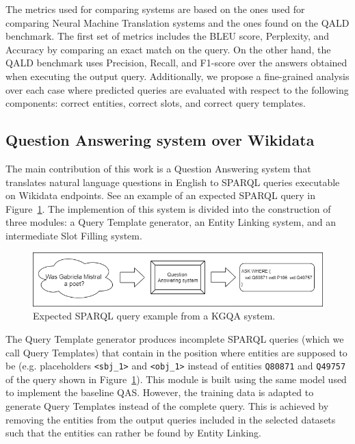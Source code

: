 The metrics used for comparing systems are based on the ones used for comparing Neural 
Machine Translation systems and the ones found on the QALD benchmark. The first set of 
metrics includes the BLEU score, Perplexity, and Accuracy by comparing an exact match on 
the \SPARQL{} query. On the other hand, the QALD benchmark uses Precision, Recall, and F1-score 
over the answers obtained when executing the output \SPARQL{} query. Additionally, 
we propose a fine-grained analysis over each case where predicted queries are evaluated with 
respect to the following components: correct entities, correct slots, and correct query 
templates.

\subsection*{Question Answering system over Wikidata}
\label{cap1:intro/contributions/qaWikidata}

The main contribution of this work is a Question Answering system that translates 
natural language questions in English to SPARQL queries executable on Wikidata endpoints. See an
example of an expected SPARQL query in Figure~\ref{fig:introQAexample}. The implemention of this 
system is divided into the construction of three modules: a Query Template generator, 
an Entity Linking system, and an intermediate Slot Filling system. 

\begin{figure}[!h]
    \centering
    \includegraphics[scale=.5]{imagenes/1_intro/introQuestionAnsweringExample.png}
    \caption{Expected SPARQL query example from a KGQA system.}
    \label{fig:introQAexample}
\end{figure}

The Query Template generator produces incomplete SPARQL queries (which we call 
Query Templates) that contain  in the position where entities are 
supposed to be (e.g. placeholders \texttt{<sbj\_1>} and \texttt{<obj\_1>} instead of entities 
\texttt{Q80871} and \texttt{Q49757} of the query shown in Figure~\ref{fig:introQAexample}). 
This module is built using the same model used to implement the baseline QAS. 
However, the training data is adapted to generate Query Templates instead of the complete 
query. This is achieved by removing the entities from the output \SPARQL{} queries included 
in the selected datasets such that the entities can rather be found by Entity Linking.

